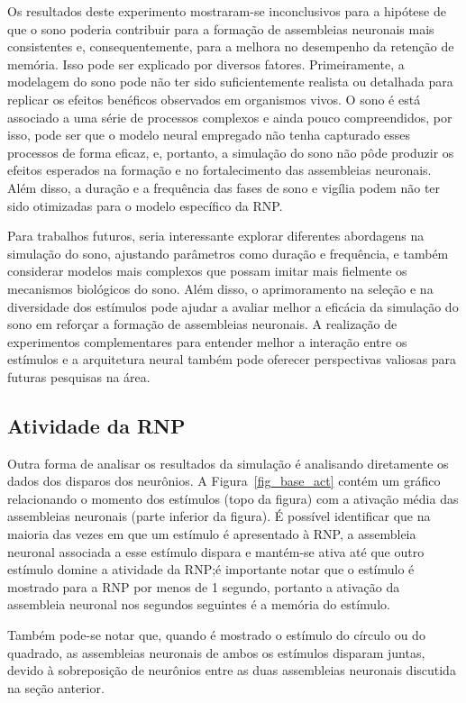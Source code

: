 Os resultados deste experimento mostraram-se inconclusivos para a hipótese de que o sono poderia contribuir para a formação de
assembleias neuronais mais consistentes e, consequentemente, para a melhora no desempenho da retenção de memória. Isso pode ser
explicado por diversos fatores. Primeiramente, a modelagem do sono pode não ter sido suficientemente realista ou detalhada para
replicar os efeitos benéficos observados em organismos vivos. O sono é está associado a uma série de processos complexos e ainda
pouco compreendidos, por isso, pode ser que o  modelo neural empregado não tenha capturado esses processos de forma eficaz, e,
portanto, a simulação do sono não pôde produzir os efeitos esperados na formação e no fortalecimento das assembleias neuronais.
Além disso, a duração e a frequência das fases de sono e vigília podem não ter sido otimizadas para o modelo específico da RNP.\@

Para trabalhos futuros, seria interessante explorar diferentes abordagens na simulação do sono, ajustando parâmetros como duração
e frequência, e também considerar modelos mais complexos que possam imitar mais fielmente os mecanismos biológicos do sono. Além
disso, o aprimoramento na seleção e na diversidade dos estímulos pode ajudar a avaliar melhor a eficácia da simulação do sono em
reforçar a formação de assembleias neuronais. A realização de experimentos complementares para entender melhor a interação entre
os estímulos e a arquitetura neural também pode oferecer perspectivas valiosas para futuras pesquisas na área.


\subsection{Atividade da RNP}

Outra forma de analisar os resultados da simulação é analisando diretamente os dados dos disparos dos neurônios. A
Figura~\ref{fig_base_act} contém um gráfico relacionando o momento dos estímulos (topo da figura) com a ativação média das
assembleias neuronais (parte inferior da figura). É possível identificar que na maioria das vezes em que um estímulo é apresentado
à RNP, a assembleia neuronal associada a esse estímulo dispara e mantém-se ativa até que outro estímulo domine a atividade da
RNP;\@ é importante notar que o estímulo é mostrado para a RNP por menos de 1 segundo, portanto a ativação da assembleia neuronal
nos segundos seguintes é a memória do estímulo.

Também pode-se notar que, quando é mostrado o estímulo do círculo ou do quadrado, as assembleias neuronais de ambos os estímulos
disparam juntas, devido à sobreposição de neurônios entre as duas assembleias neuronais discutida na seção anterior.


